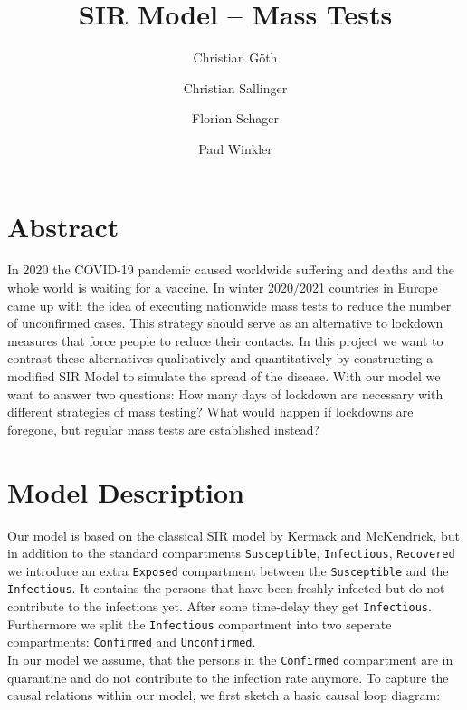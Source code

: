 \documentclass
[
    report,
    11pt,
    bibliography = totoc,
    listof = totoc,
    headinclude = true,
]
{scrreport}
\begin{document}
\subject{Modeling \& Simulation}
\title{SIR Model -- Mass Tests}

\publishers{Betreuer: Martin Bicher}


\author{
Christian Göth \and
Christian Sallinger \and
Florian Schager \and
Paul Winkler
}


\maketitle

\chapter*{Abstract}

In 2020 the COVID-19 pandemic caused worldwide suffering and deaths and the
whole world is waiting for a vaccine. In winter 2020/2021 countries in Europe
came up with the idea of executing nationwide mass tests to reduce the number
of unconfirmed cases. This strategy should serve as an alternative to
lockdown measures that force people to reduce their contacts.
In this project we want to contrast these alternatives qualitatively and quantitatively
by constructing a modified SIR Model to simulate the spread of the disease.
With our model we want to answer two questions:
How many days of lockdown are necessary with different strategies of mass testing?
What would happen if lockdowns are foregone, but regular mass tests are established instead?

\tableofcontents


\chapter{Model Description}

Our model is based on the classical SIR model by Kermack and McKendrick,
but in addition to the standard compartments \texttt{Susceptible}, \texttt{Infectious}, \texttt{Recovered} we introduce an extra \texttt{Exposed} compartment between the \texttt{Susceptible} and the \texttt{Infectious}. It contains the persons that have been freshly infected but do not contribute to the infections yet. After some time-delay they get \texttt{Infectious}.
Furthermore we split the \texttt{Infectious} compartment into two seperate compartments:
\texttt{Confirmed} and \texttt{Unconfirmed}. \\
In our model we assume, that the persons in the \texttt{Confirmed} compartment are in
quarantine and do not contribute to the infection rate anymore.
To capture the causal relations within our model, we first sketch a basic
causal loop diagram:
\end{document}
